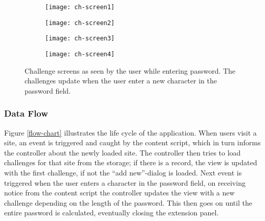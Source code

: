 \begin{figure}
    \centering
    \begin{subfigure}[t]{0.45\textwidth}
        \centering
        \texttt{[image: ch-screen1]} 
        \caption{}
        \label{challenge-screen1}
    \end{subfigure}
    \hfill
    \begin{subfigure}[t]{0.45\textwidth}
        \centering
        \texttt{[image: ch-screen2]} 
        \caption{}
        \label{challenge-screen2}
    \end{subfigure}
    \hfill
    \begin{subfigure}[t]{0.45\textwidth}
        \centering
        \texttt{[image: ch-screen3]} 
        \caption{}
        \label{challenge-screen3}
    \end{subfigure}
    \hfill
    \begin{subfigure}[t]{0.45\textwidth}
        \centering
        \texttt{[image: ch-screen4]} 
        \caption{}
        \label{challenge-screen4}
    \end{subfigure}
    \caption{Challenge screens as seen by the user while entering password. The challenges update when the user enter a new character in the password field.}
    \label{ch-screens}
\end{figure}



\subsubsection{Data Flow}\label{data-flow}
Figure \ref{flow-chart} illustrates the life cycle of the application. When users visit a site, an event is triggered and caught by the content script, which in turn informs the controller about the newly loaded site. The controller then tries to load challenges for that site from the storage; if there is a record, the view is updated with the first challenge, if not the ``add new''-dialog is loaded. Next event is triggered when the user enters a character in the password field, on receiving notice from the content script the controller updates the view with a new challenge depending on the length of the password. This then goes on until the entire password is calculated, eventually closing the extension panel.


